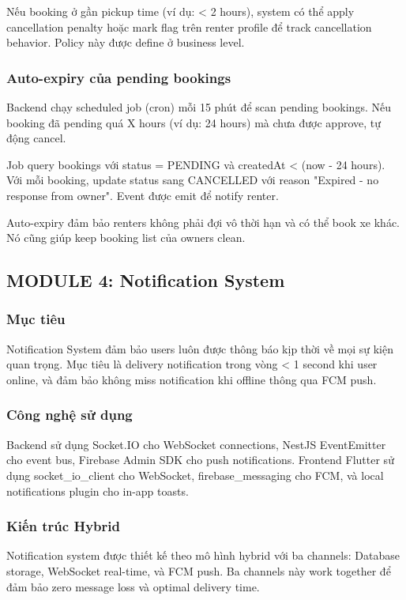 Nếu booking ở gần pickup time (ví dụ: < 2 hours), system có thể apply cancellation penalty hoặc mark flag trên renter profile để track cancellation behavior. Policy này được define ở business level.

\subsubsection{Auto-expiry của pending bookings}
Backend chạy scheduled job (cron) mỗi 15 phút để scan pending bookings. Nếu booking đã pending quá X hours (ví dụ: 24 hours) mà chưa được approve, tự động cancel.

Job query bookings với status = PENDING và createdAt < (now - 24 hours). Với mỗi booking, update status sang CANCELLED với reason "Expired - no response from owner". Event được emit để notify renter.

Auto-expiry đảm bảo renters không phải đợi vô thời hạn và có thể book xe khác. Nó cũng giúp keep booking list của owners clean.

\subsection{MODULE 4: Notification System}

\subsubsection{Mục tiêu}
Notification System đảm bảo users luôn được thông báo kịp thời về mọi sự kiện quan trọng. Mục tiêu là delivery notification trong vòng < 1 second khi user online, và đảm bảo không miss notification khi offline thông qua FCM push.

\subsubsection{Công nghệ sử dụng}
Backend sử dụng Socket.IO cho WebSocket connections, NestJS EventEmitter cho event bus, Firebase Admin SDK cho push notifications. Frontend Flutter sử dụng socket\_io\_client cho WebSocket, firebase\_messaging cho FCM, và local notifications plugin cho in-app toasts.

\subsubsection{Kiến trúc Hybrid}
Notification system được thiết kế theo mô hình hybrid với ba channels: Database storage, WebSocket real-time, và FCM push. Ba channels này work together để đảm bảo zero message loss và optimal delivery time.

